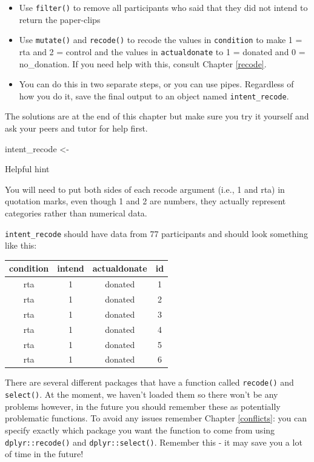 \documentclass[]{book}
\newenvironment{Shaded}{\begin{snugshade}}{\end{snugshade}}
\newcommand{\NormalTok}[1]{#1}
\providecommand{\tightlist}{%
  \setlength{\itemsep}{0pt}\setlength{\parskip}{0pt}}
\begin{document}
\begin{itemize}
\tightlist
\item
  Use \texttt{filter()} to remove all participants who said that they did not intend to return the paper-clips
\item
  Use \texttt{mutate()} and \texttt{recode()} to recode the values in \texttt{condition} to make 1 = rta and 2 = control and the values in \texttt{actualdonate} to 1 = donated and 0 = no\_donation. If you need help with this, consult Chapter \ref{recode}.
\item
  You can do this in two separate steps, or you can use pipes. Regardless of how you do it, save the final output to an object named \texttt{intent\_recode}.
\end{itemize}

The solutions are at the end of this chapter but make sure you try it yourself and ask your peers and tutor for help first.

\begin{Shaded}
\begin{Highlighting}[]
\NormalTok{intent_recode <-}
\end{Highlighting}
\end{Shaded}

Helpful hint

You will need to put both sides of each recode argument (i.e., 1 and rta) in quotation marks, even though 1 and 2 are numbers, they actually represent categories rather than numerical data.

\texttt{intent\_recode} should have data from 77 participants and should look something like this:

\begin{tabular}{c|c|c|c}
\hline
condition & intend & actualdonate & id\\
\hline
rta & 1 & donated & 1\\
\hline
rta & 1 & donated & 2\\
\hline
rta & 1 & donated & 3\\
\hline
rta & 1 & donated & 4\\
\hline
rta & 1 & donated & 5\\
\hline
rta & 1 & donated & 6\\
\hline
\end{tabular}

\begin{warn}
There are several different packages that have a function called
\texttt{recode()} and \texttt{select()}. At the moment, we haven't
loaded them so there won't be any problems however, in the future you
should remember these as potentially problematic functions. To avoid any
issues remember Chapter \ref{conflicts}: you can specify exactly which
package you want the function to come from using
\texttt{dplyr::recode()} and \texttt{dplyr::select()}. Remember this -
it may save you a lot of time in the future!
\end{warn}
\end{document}
